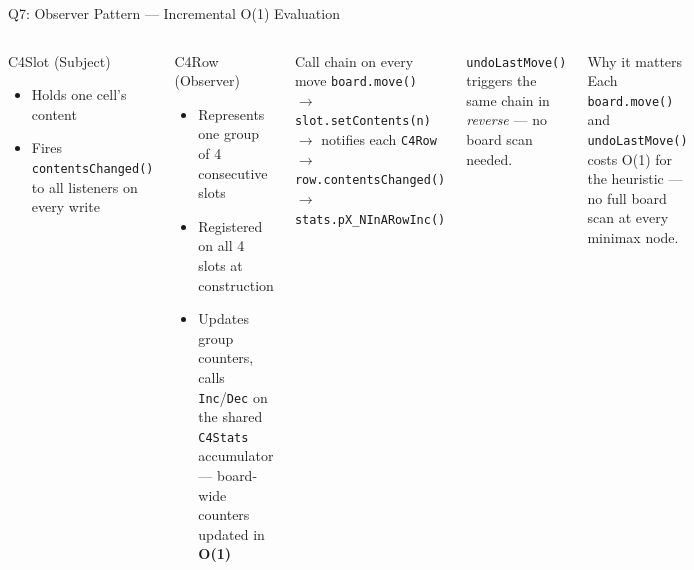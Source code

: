 \documentclass[aspectratio=1610]{beamer}
\begin{document}
\begin{frame}{Q7: Observer Pattern --- Incremental O(1) Evaluation}
  \begin{columns}[T]
      \begin{block}{C4Slot (Subject)}
        \footnotesize
        \begin{itemize}
          \item Holds one cell's content
          \item Fires \texttt{contentsChanged()} to all listeners on every write
        \end{itemize}
      \end{block}
      \begin{block}{C4Row (Observer)}
        \footnotesize
        \begin{itemize}
          \item Represents one group of 4 consecutive slots
          \item Registered on all 4 slots at construction
          \item Updates group counters, calls \texttt{Inc}/\texttt{Dec} on the shared \texttt{C4Stats} accumulator — board-wide counters updated in \textbf{O(1)}
        \end{itemize}
      \end{block}
      \begin{exampleblock}{Call chain on every move}
        \footnotesize
        \texttt{board.move()}\\
        \quad $\to$ \texttt{slot.setContents(n)}\\
        \quad\quad $\to$ notifies each \texttt{C4Row}\\
        \quad\quad\quad $\to$ \texttt{row.contentsChanged()}\\
        \quad\quad\quad\quad $\to$ \texttt{stats.pX\_NInARowInc()}
      \end{exampleblock}
      \vspace{0.4em}
      \texttt{undoLastMove()} triggers the same chain in \emph{reverse} — no board scan needed.
      \vspace{0.4em}
      \begin{block}{Why it matters}
        \footnotesize
        Each \texttt{board.move()} and \texttt{undoLastMove()} costs O(1) for the heuristic — no full board scan at every minimax node.
      \end{block}
  \end{columns}
\end{frame}
\end{document}
